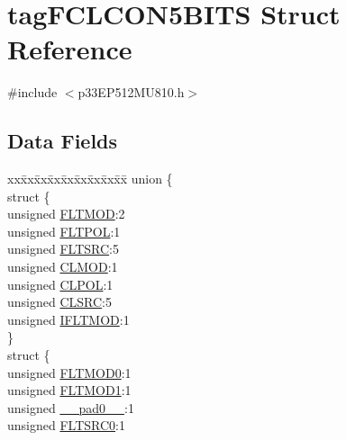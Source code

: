 \hypertarget{structtag_f_c_l_c_o_n5_b_i_t_s}{}\section{tag\+F\+C\+L\+C\+O\+N5\+B\+I\+TS Struct Reference}
\label{structtag_f_c_l_c_o_n5_b_i_t_s}


{\ttfamily \#include $<$p33\+E\+P512\+M\+U810.\+h$>$}

\subsection*{Data Fields}
\begin{DoxyCompactItemize}
\item 
\begin{tabbing}
xx\=xx\=xx\=xx\=xx\=xx\=xx\=xx\=xx\=\kill
union \{\\
\>struct \{\\
\>\>unsigned \hyperlink{structtag_f_c_l_c_o_n5_b_i_t_s_af8b7a5d667b31f1b0185c35ff963fc67}{FLTMOD}:2\\
\>\>unsigned \hyperlink{structtag_f_c_l_c_o_n5_b_i_t_s_acc9b95c2c3d735179abf0bb2304d00aa}{FLTPOL}:1\\
\>\>unsigned \hyperlink{structtag_f_c_l_c_o_n5_b_i_t_s_a5a279b9076b9774eeddf447ae606182a}{FLTSRC}:5\\
\>\>unsigned \hyperlink{structtag_f_c_l_c_o_n5_b_i_t_s_a9e490f0d4e5c9492ed27b0835fd4baa1}{CLMOD}:1\\
\>\>unsigned \hyperlink{structtag_f_c_l_c_o_n5_b_i_t_s_aa4163df728ce542fa3662a31fed0dab0}{CLPOL}:1\\
\>\>unsigned \hyperlink{structtag_f_c_l_c_o_n5_b_i_t_s_a55ab508cbc7a5023f1962f743a92a56b}{CLSRC}:5\\
\>\>unsigned \hyperlink{structtag_f_c_l_c_o_n5_b_i_t_s_a4573eed251d96a98a6b5ba1c7cc30451}{IFLTMOD}:1\\
\>\} \\
\>struct \{\\
\>\>unsigned \hyperlink{structtag_f_c_l_c_o_n5_b_i_t_s_acd6a08a1920b6cc12c170cbd6a61247d}{FLTMOD0}:1\\
\>\>unsigned \hyperlink{structtag_f_c_l_c_o_n5_b_i_t_s_accd970bed6a20d6ed7d5a8bb0a9329a3}{FLTMOD1}:1\\
\>\>unsigned \hyperlink{structtag_f_c_l_c_o_n5_b_i_t_s_adf71f3d8410c1f1dbbc96680a92c49af}{\_\_pad0\_\_}:1\\
\>\>unsigned \hyperlink{structtag_f_c_l_c_o_n5_b_i_t_s_ab130e70dc1cfc857cc586e187458c5ea}{FLTSRC0}:1\\

\end{tabbing}
\end{DoxyCompactItemize}
